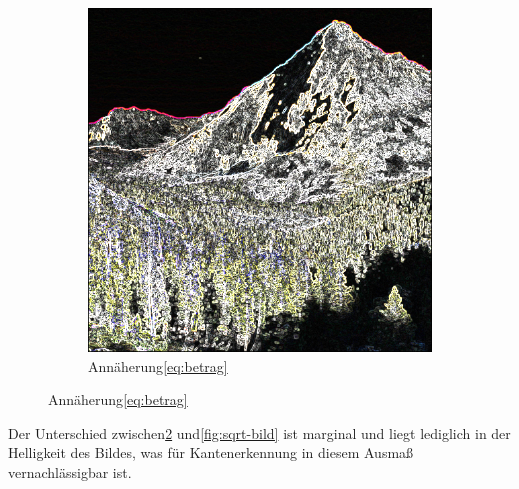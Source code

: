 \documentclass[course=erap]{aspdoc}
\begin{document}
\begin{figure}[H]
\begin{subfigure}{.5\columnwidth}
        \includegraphics[width=\columnwidth]{graphics/johnmuirtrail_sobel}
        \caption{Annäherung\ref{eq:betrag}}
        \label{fig:abs-bild}
    \end{subfigure}
\end{figure}
Der Unterschied zwischen\ref{fig:abs-bild} und\ref{fig:sqrt-bild} ist marginal und liegt lediglich in der Helligkeit des Bildes, was für Kantenerkennung in diesem Ausmaß vernachlässigbar ist.
\end{document}
